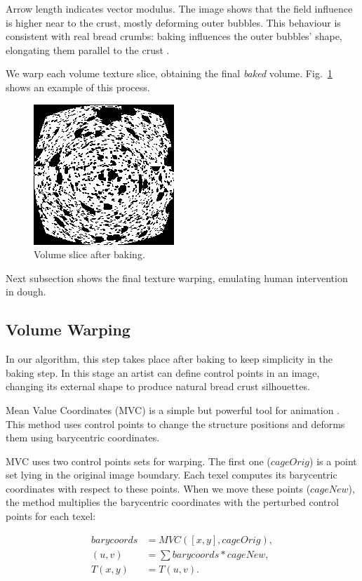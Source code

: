 \documentclass[final,5p,times]{elsarticle}
\begin{document}
Arrow length indicates vector modulus. The image shows that the field influence is higher near to the crust, mostly deforming outer bubbles. This behaviour is consistent with real bread crumbs: baking influences the outer bubbles' shape, elongating them parallel to the crust \cite{Scanlon2001}. 


We warp each volume texture slice, obtaining the final {\em baked} volume. Fig.~\ref{Fig4} shows an example of this process.  

\begin{figure}
\includegraphics[scale=1.0]{baking.png}
\caption{Volume slice after baking.}
\label{Fig4}
\end{figure}

Next subsection shows the final texture warping, emulating human intervention in dough.


\subsection{Volume Warping}
In our algorithm, this step takes place after baking to keep simplicity in the baking step.  In this stage an artist can define control points in an image, changing its external shape to produce natural bread crust silhouettes. 

Mean Value Coordinates (MVC) is a simple but powerful tool for animation \cite{Floater2003,Floater2005,Ju2005}.  This method uses control points to change the structure positions and deforms them using barycentric coordinates.

MVC uses two control points sets for warping. The first one ($cageOrig$) is a point set lying in the original image boundary.  Each texel computes its barycentric coordinates with respect to these points. When we move these points ($cageNew$), the method multiplies the barycentric coordinates with the perturbed control points for each texel:

\begin{align}
barycoords &= MVC([x,y],cageOrig),\\
(u,v) &= \sum {barycoords * cageNew}, \\
T(x,y) &= T(u,v).
\end{align}
\end{document}
